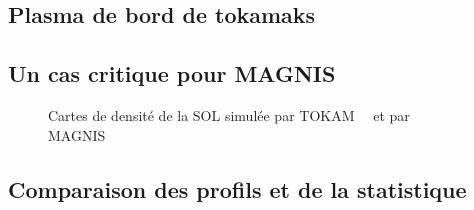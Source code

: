 \begin{refsection}
\section{Plasma de bord de tokamaks}
\subsection{Un cas critique pour MAGNIS}

\begin{figure}[htbp]
  \centering
    \caption{Cartes de densité de la SOL simulée par
    TOKAM~~ et par MAGNIS~}
    \label{pandas}
\end{figure}
\subsection{Comparaison des profils et de la statistique}


\end{refsection}
